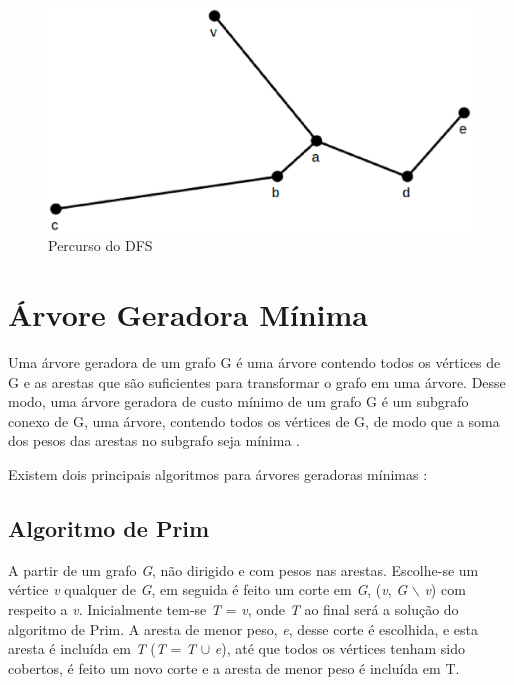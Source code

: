 \begin{apendicesenv}
\begin{figure}[!h]
	\centering
	\includegraphics[scale=0.25]{figuras/capitulo2/dfs/dfs_percurso.eps}
	\caption[Percurso do DFS]{Percurso do DFS \cite{Cormen:2001}}
	\label{dfs_percurso}
\end{figure}

\section{Árvore Geradora Mínima}

Uma árvore geradora de um grafo G é uma árvore contendo todos os vértices de G e as arestas que são suficientes para transformar o grafo em uma árvore. Desse modo, uma árvore geradora de custo mínimo de um grafo G é um subgrafo conexo de G, uma árvore, contendo todos os vértices de G, de modo que a soma dos pesos das arestas no subgrafo seja mínima \cite{Rezende:2002}.

Existem dois principais algoritmos para árvores geradoras mínimas \cite{Bondy:2007}:

\subsection{Algoritmo de Prim}

A partir de um grafo \textit{G}, não dirigido e com pesos nas arestas. Escolhe-se um vértice \textit{v} qualquer de \textit{G}, em seguida é feito um corte em \textit{G}, ({\textit{v}}, \textit{G} $\backslash$ {\textit{v}}) com respeito a \textit{v}. Inicialmente tem-se \textit{T} = {\textit{v}}, onde \textit{T} ao final será a solução do algoritmo de Prim. A aresta de menor peso, \textit{e}, desse corte é escolhida, e esta aresta é incluída em \textit{T} (\textit{T} = \textit{T} $\cup$ {\textit{e}}), até que todos os vértices tenham sido cobertos, é feito um novo corte e a aresta de menor peso é incluída em T.


\end{apendicesenv}
